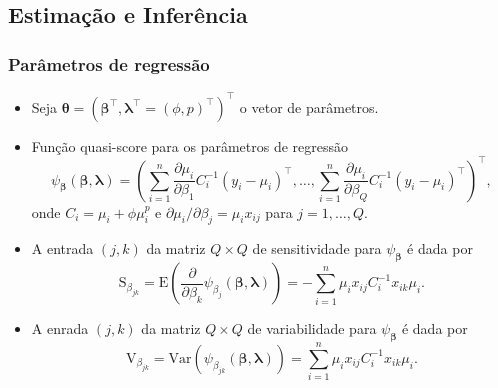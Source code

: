 \documentclass[10pt, aspectratio=169]{beamer}\usepackage[]{graphicx}\usepackage[]{color}
\begin{document}
\subsection{Estimação e Inferência}
\begin{frame}[c]
\frametitle{Parâmetros de regressão}
\begin{itemize}
\item Seja $\boldsymbol{\theta} = (\boldsymbol{\beta}^\top, \boldsymbol{\lambda}^\top = (\phi, p)^\top)^\top$ 
o vetor de parâmetros.
\item Função quasi-score para os parâmetros de regressão
\begin{equation*}
\psi_{\boldsymbol{\beta}}(\boldsymbol{\beta}, \boldsymbol{\lambda}) = \left (\sum_{i=1}^n \frac{\partial \mu_i}{\partial \beta_1}C^{-1}_i(y_i - \mu_i)^\top, \ldots, \sum_{i=1}^n \frac{\partial \mu_i}{\partial \beta_Q}C^{-1}_i(y_i - \mu_i)^\top  \right )^\top,
\end{equation*}
onde $C_i = \mu_i + \phi \mu_i^p$ e $\partial \mu_i/\partial \beta_j = \mu_i x_{ij}$ para $j = 1, \ldots, Q$.
\item A entrada $(j,k)$ da matriz $Q \times Q$ de sensitividade para $\psi_{\boldsymbol{\beta}}$ é dada por
\begin{equation}
\label{Sbeta}
\mathrm{S}_{\beta_{jk}} = \mathrm{E}\left ( \frac{\partial}{\partial \beta_k} \psi_{\beta_j}(\boldsymbol{\beta}, \boldsymbol{\lambda})  \right ) = -\sum_{i=1}^n \mu_i x_{ij} C^{-1}_i x_{ik} \mu_i.
\end{equation}
\item A enrada $(j,k)$ da matriz $Q \times Q$  de variabilidade para $\psi_{\boldsymbol{\beta}}$ é dada por
\begin{equation}
\label{Vbeta}
\mathrm{V}_{\beta_{jk}} = \mathrm{Var}(\psi_{\beta_{jk}}(\boldsymbol{\beta}, \boldsymbol{\lambda})) = \sum_{i=1}^n \mu_i x_{ij} C^{-1}_i x_{ik} \mu_i.
\end{equation}
\end{itemize}
\end{frame}
\end{document}
